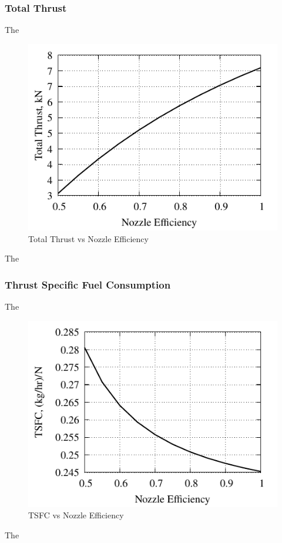 \documentclass[conf]{new-aiaa} %
\begin{document}
\subsubsection{Total Thrust}
The

\begin{figure}[H] %
    \centering
    \includegraphics[]{media/performance_parameter_files/part_g_T.pdf}
    \caption{\label{fig:partgt}Total Thrust vs Nozzle Efficiency}
\end{figure}
The

\subsubsection{Thrust Specific Fuel Consumption}
The

\begin{figure}[H] %
    \centering
    \includegraphics[]{media/performance_parameter_files/part_g_TSFC.pdf}
    \caption{\label{fig:partgtsfc}TSFC vs Nozzle Efficiency}
\end{figure}
The
\end{document}
